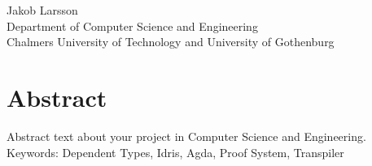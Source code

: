 \oneLineTitle\\
\oneLineSubtitle\\
Jakob Larsson\\
Department of Computer Science and Engineering\\
Chalmers University of Technology and University of Gothenburg\setlength{\parskip}{0.5cm}

\thispagestyle{plain}			%
\setlength{\parskip}{0pt plus 1.0pt}
\section*{Abstract}
Abstract text about your project in  Computer Science and Engineering.
%
\vfill
Keywords: Dependent Types, Idris, Agda, Proof System, Transpiler

\newpage				%
\thispagestyle{empty}
\mbox{}
